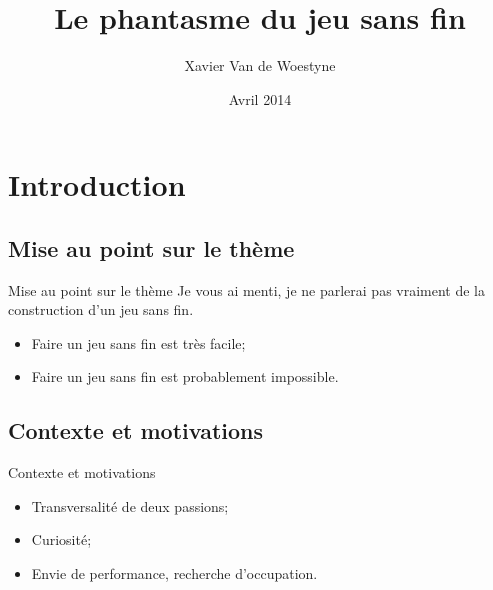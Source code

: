 \documentclass{beamer}
\title[Le phantasme du jeu sans fin]{Le phantasme du jeu sans fin}
\author{Xavier Van de Woestyne}
\date{Avril 2014}
\begin{document}
\begin{frame}
\titlepage
\end{frame}


\section{Introduction}

\subsection{Mise au point sur le thème}
\begin{frame}{Mise au point sur le thème}
  Je vous ai menti, je ne parlerai pas vraiment de la construction d'un jeu sans fin.\newline \newline
  \begin{itemize}
    \item Faire un jeu sans fin est très facile;
    \item Faire un jeu sans fin est probablement impossible.
  \end{itemize}
\end{frame}

\subsection{Contexte et motivations}
\begin{frame}{Contexte et motivations}
  \begin{itemize}
    \item Transversalité de deux passions;
    \item Curiosité;
    \item Envie de performance, recherche d'occupation.
  \end{itemize}
\end{frame}
\end{document}
